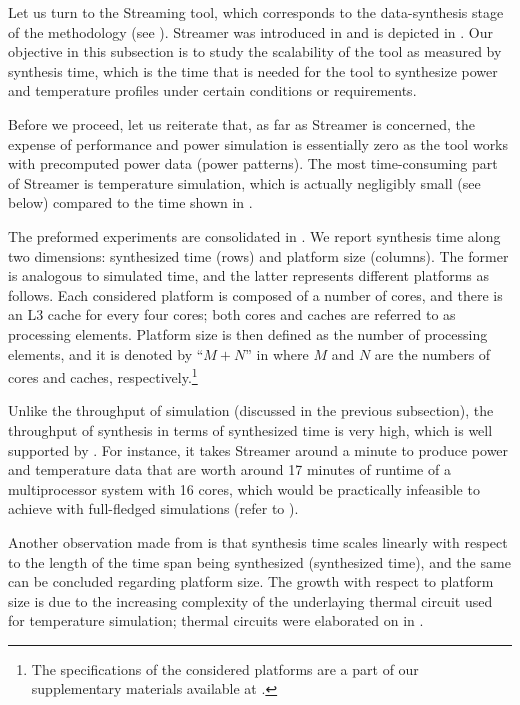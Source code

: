 
Let us turn to the Streaming tool, which corresponds to the data-synthesis stage
of the methodology (see ). Streamer was introduced in
 and is depicted in . Our objective in this
subsection is to study the scalability of the tool as measured by synthesis
time, which is the time that is needed for the tool to synthesize power and
temperature profiles under certain conditions or requirements.

Before we proceed, let us reiterate that, as far as Streamer is concerned, the
expense of performance and power simulation is essentially zero as the tool
works with precomputed power data (power patterns). The most time-consuming part
of Streamer is temperature simulation, which is actually negligibly small (see
below) compared to the time shown in .

The preformed experiments are consolidated in . We report
synthesis time along two dimensions: synthesized time (rows) and platform size
(columns). The former is analogous to simulated time, and the latter represents
different platforms as follows. Each considered platform is composed of a number
of cores, and there is an L3 cache for every four cores; both cores and caches
are referred to as processing elements. Platform size is then defined as the
number of processing elements, and it is denoted by ``$M + N$'' in
 where $M$ and $N$ are the numbers of cores and caches,
respectively.\footnote{The specifications of the considered platforms are a part
of our supplementary materials available at \cite{sources}.}

Unlike the throughput of simulation (discussed in the previous subsection), the
throughput of synthesis in terms of synthesized time is very high, which is well
supported by . For instance, it takes Streamer around a minute
to produce power and temperature data that are worth around 17 minutes of
runtime of a multiprocessor system with 16 cores, which would be practically
infeasible to achieve with full-fledged simulations (refer to ).

Another observation made from  is that synthesis time scales
linearly with respect to the length of the time span being synthesized
(synthesized time), and the same can be concluded regarding platform size. The
growth with respect to platform size is due to the increasing complexity of the
underlaying thermal  circuit used for temperature simulation; thermal
circuits were elaborated on in .
